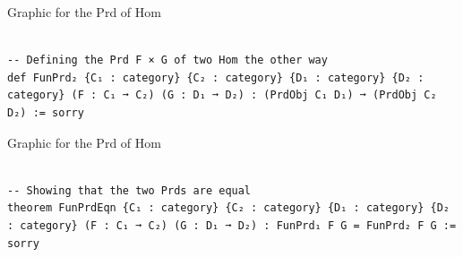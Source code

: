 \documentclass{book}
\newcounter{lcounter}
\begin{document}
\begin{center}
\begin{tcolorbox}[width=5in,colback={white},title={\begin{center} Graphic \addtocounter{lcounter}{1}  \end{center}},colbacktitle=Yellow,coltitle=black]

Graphic for the Prd of Hom

\end{tcolorbox}
\end{center}


\begin{center}
\begin{tcolorbox}[width=5in,colback={white},title={\begin{center}\texttt{Lean \thelcounter} \addtocounter{lcounter}{1}  \end{center}},colbacktitle=Blue,coltitle=black]
\begin{verbatim}

-- Defining the Prd F × G of two Hom the other way
def FunPrd₂ {C₁ : category} {C₂ : category} {D₁ : category} {D₂ : category} (F : C₁ ➞ C₂) (G : D₁ ➞ D₂) : (PrdObj C₁ D₁) ➞ (PrdObj C₂ D₂) := sorry

\end{verbatim}%
\end{tcolorbox}
\end{center}

\begin{center}
\begin{tcolorbox}[width=5in,colback={white},title={\begin{center} Graphic \addtocounter{lcounter}{1}  \end{center}},colbacktitle=Yellow,coltitle=black]

Graphic for the Prd of Hom 

\end{tcolorbox}
\end{center}


\begin{center}
\begin{tcolorbox}[width=5in,colback={white},title={\begin{center}\texttt{Lean \thelcounter} \addtocounter{lcounter}{1}  \end{center}},colbacktitle=Blue,coltitle=black]
\begin{verbatim}

-- Showing that the two Prds are equal
theorem FunPrdEqn {C₁ : category} {C₂ : category} {D₁ : category} {D₂ : category} (F : C₁ ➞ C₂) (G : D₁ ➞ D₂) : FunPrd₁ F G = FunPrd₂ F G := sorry

\end{verbatim}%
\end{tcolorbox}
\end{center}
\end{document}
